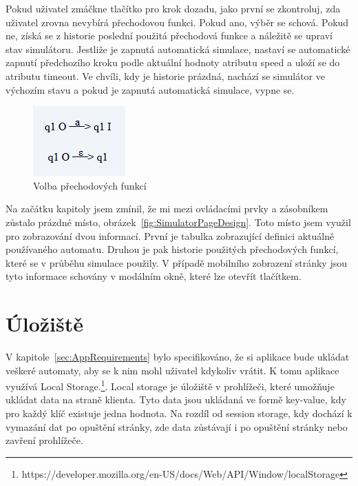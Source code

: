 Pokud uživatel zmáčkne tlačítko pro krok dozadu, jako první se zkontroluj, zda uživatel zrovna nevybírá přechodovou funkci. Pokud ano, výběr se schová. Pokud ne, získá se z historie poslední použitá přechodová funkce a náležitě se upraví stav simulátoru. Jestliže je zapnutá automatická simulace, nastaví se automatické zapnutí předchozího kroku podle aktuální hodnoty atributu speed a uloží se do atributu timeout. Ve chvíli, kdy je historie prázdná, nachází se simulátor ve výchozím stavu a pokud je zapnutá automatická simulace, vypne se.

\begin{figure}[h]
    \centering
    \includegraphics{Figures/PrntScrn_TransitionFunctionChoosing.png}
    \caption{Volba přechodových funkcí}\label{fig:TransitionFunctionChoosing}
\end{figure}

Na začátku kapitoly jsem zmínil, že mi mezi ovládacími prvky a zásobníkem zůstalo prázdné místo, obrázek~\ref{fig:SimulatorPageDesign}. Toto místo jsem využil pro zobrazování dvou informací. První je tabulka zobrazující definici aktuálně používaného automatu. Druhou je pak historie použitých přechodových funkcí, které se v průběhu simulace použily. V případě mobilního zobrazení stránky jsou tyto informace schovány v modálním okně, které lze otevřít tlačítkem.

\section{Úložiště}
V kapitole~\ref{sec:AppRequirements} bylo specifikováno, že si aplikace bude ukládat veškeré automaty, aby se k nim mohl uživatel kdykoliv vrátit. K tomu aplikace využívá Local Storage.\footnote{https://developer.mozilla.org/en-US/docs/Web/API/Window/localStorage}. Local storage je úložiště v prohlížeči, které umožňuje ukládat data na straně klienta. Tyto data jsou ukládaná ve formě key-value, kdy pro každý klíč existuje jedna hodnota. Na rozdíl od session storage, kdy dochází k vymazání dat po opuštění stránky, zde data zůstávají i po opuštění stránky nebo zavření prohlížeče.

